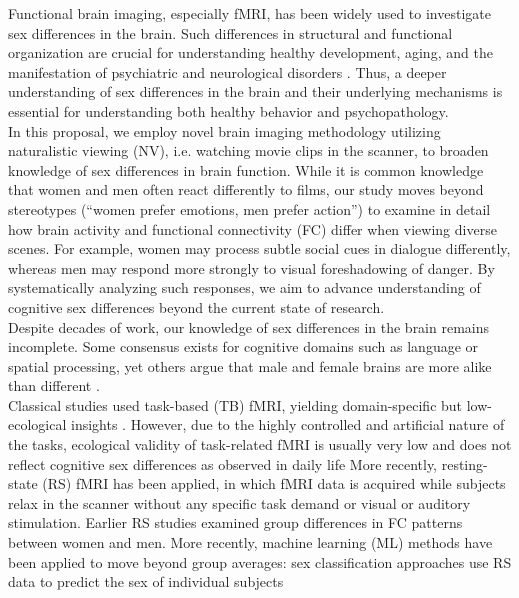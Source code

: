 \documentclass[11pt,a4paper]{article}
\begin{document}
Functional brain imaging, especially fMRI, has been widely used to investigate sex differences in the brain. 
Such differences in structural and functional organization are crucial for understanding healthy development, 
aging, and the manifestation of psychiatric and neurological disorders \parencite{cahillWhySexMatters2006a,gobinathSexHormonesGenotype2017a}. 
Thus, a deeper understanding of sex differences in the brain and their underlying mechanisms is essential 
for understanding both healthy behavior and psychopathology.\\
In this proposal, we employ novel brain imaging methodology utilizing naturalistic viewing (NV), i.e. watching movie 
clips in the scanner, to broaden knowledge of sex differences in brain function. While it is common knowledge 
that women and men often react differently to films, our study moves beyond stereotypes (“women prefer emotions, 
men prefer action”) to examine in detail how brain activity and functional connectivity (FC) differ when 
viewing diverse scenes. For example, women may process subtle social cues in dialogue differently, whereas 
men may respond more strongly to visual foreshadowing of danger. By systematically analyzing such responses, 
we aim to advance understanding of cognitive sex differences beyond the current state of research.\\
Despite decades of work, our knowledge of sex differences in the brain remains incomplete. Some consensus exists 
for cognitive domains such as language or spatial processing, yet others argue that male and female brains are more 
alike than different \parencite{joelSexGenitaliaHuman2015a}.\\
Classical studies used task-based (TB) fMRI, yielding domain-specific but low-ecological insights 
\parencite{thimmMenstrualCycleEffects2014a,weisDynamicChangesFunctional2011,weisEstradiolModulatesFunctional2008}. 
However, due to the highly controlled and artificial nature of the tasks, ecological validity of task-related fMRI is usually 
very low and does not reflect cognitive sex differences as observed in daily life
More recently, resting-state (RS) fMRI has been applied, in which fMRI data is acquired while subjects relax 
in the scanner without any specific task demand or visual or auditory stimulation.
Earlier RS studies examined group differences in FC patterns between women and men. 
More recently, machine learning (ML) methods have been applied to move beyond group averages: 
sex classification approaches use RS data to predict the sex of individual subjects 
\end{document}
